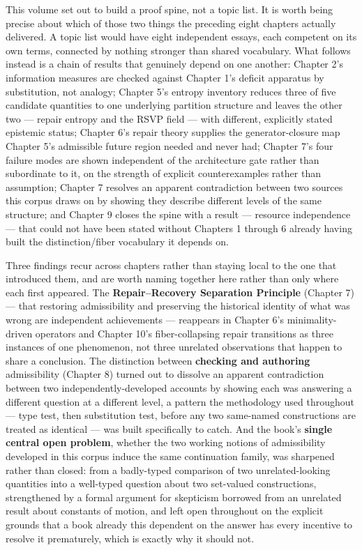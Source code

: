 \documentclass[12pt]{report}
\begin{document}
This volume set out to build a proof spine, not a topic list. It is
worth being precise about which of those two things the preceding eight
chapters actually delivered. A topic list would have eight independent
essays, each competent on its own terms, connected by nothing stronger
than shared vocabulary. What follows instead is a chain of
results that genuinely depend on one another: Chapter 2's information
measures are checked against Chapter 1's deficit apparatus by
substitution, not analogy; Chapter 5's entropy inventory reduces three
of five candidate quantities to one underlying partition structure and
leaves the other two --- repair entropy and the RSVP field --- with
different, explicitly stated epistemic status; Chapter 6's repair theory
supplies the generator-closure map Chapter 5's admissible future region
needed and never had; Chapter 7's four failure modes are shown
independent of the architecture gate rather than subordinate to it, on
the strength of explicit counterexamples rather than assumption; Chapter
7 resolves an apparent contradiction between two sources this corpus
draws on by showing they describe different levels of the same
structure; and Chapter 9 closes the spine with a result --- resource
independence --- that could not have been stated without Chapters 1
through 6 already having built the distinction/fiber vocabulary it
depends on.

Three findings recur across chapters rather than staying local to the
one that introduced them, and are worth naming together here rather than
only where each first appeared. The \textbf{Repair--Recovery Separation
Principle} (Chapter 7) --- that restoring admissibility and preserving
the historical identity of what was wrong are independent achievements
--- reappears in Chapter 6's minimality-driven operators and Chapter
10's fiber-collapsing repair transitions as three instances of one
phenomenon, not three unrelated observations that happen to share a
conclusion. The distinction between \textbf{checking and authoring}
admissibility (Chapter 8) turned out to dissolve an apparent
contradiction between two independently-developed accounts by showing
each was answering a different question at a different level, a pattern
the methodology used throughout --- type test, then substitution test, before
any two same-named constructions are treated as identical --- was built
specifically to catch. And the book's \textbf{single central open
problem}, whether the two working notions of admissibility developed in
this corpus induce the same continuation family, was sharpened rather
than closed: from a badly-typed comparison of two unrelated-looking
quantities into a well-typed question about two set-valued constructions,
strengthened by a formal argument for skepticism borrowed from an
unrelated result about constants of motion, and left open throughout on
the explicit grounds that a book already this dependent on the answer
has every incentive to resolve it prematurely, which is exactly why it
should not.
\end{document}
